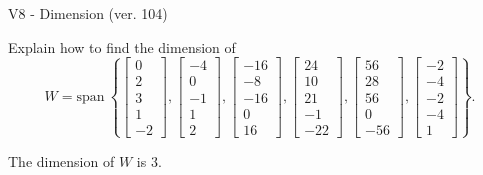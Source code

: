 \begin{exercise}
  \begin{exerciseTitle}V8 - Dimension (ver. 104)\end{exerciseTitle}
  \begin{exerciseStatement}
    Explain how to find the dimension of 
\[W=\mathrm{span}\ \left\{\left[\begin{array}{r}
0 \\
2 \\
3 \\
1 \\
-2
\end{array}\right] , \left[\begin{array}{r}
-4 \\
0 \\
-1 \\
1 \\
2
\end{array}\right] , \left[\begin{array}{r}
-16 \\
-8 \\
-16 \\
0 \\
16
\end{array}\right] , \left[\begin{array}{r}
24 \\
10 \\
21 \\
-1 \\
-22
\end{array}\right] , \left[\begin{array}{r}
56 \\
28 \\
56 \\
0 \\
-56
\end{array}\right] , \left[\begin{array}{r}
-2 \\
-4 \\
-2 \\
-4 \\
1
\end{array}\right]\right\}.\]



  \end{exerciseStatement}
  \begin{exerciseAnswer}
   The dimension of \(W\) is  \(3\).
  


  \end{exerciseAnswer}
\end{exercise}